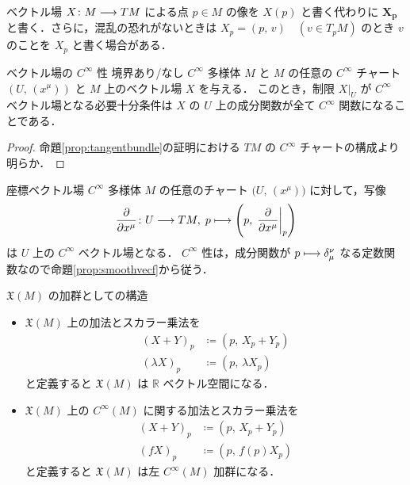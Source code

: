 \documentclass[TQFT_main]{subfiles}
\begin{document}
\begin{marker}
    ベクトル場 $X \colon M \longrightarrow TM$ による点 $ p\in M$ の像を $X(p)$ と書く代わりに $\bm{X_p}$ と書く．さらに，混乱の恐れがないときは $X_p = (p,\, v)\quad (v \in T_p M)$ のとき $v$ のことを $X_p$ と書く場合がある．
\end{marker}


\begin{myprop}[label=prop:smoothvecf]{ベクトル場の $C^\infty$ 性}
    境界あり/なし $C^\infty$ 多様体 $M$ と $M$ の任意の $C^\infty$ チャート $(U,\, (x^\mu))$ と $M$ 上のベクトル場 $X$ を与える．
    このとき，制限 $X|_U$ が $C^\infty$ ベクトル場となる必要十分条件は $X$ の $U$ 上の成分関数が全て $C^\infty$ 関数になることである．
\end{myprop}

\begin{proof}
    命題\ref{prop:tangentbundle}の証明における $TM$ の $C^\infty$ チャートの構成より明らか．
\end{proof}

\begin{myexample}[label=def:coord-vecf]{座標ベクトル場}
    $C^\infty$ 多様体 $M$ の任意のチャート $\bigl( U,\, (x^\mu) \bigr)$ に対して，写像
    \begin{align}
        \pdv{}{x^\mu} \colon U \lto TM,\; p \lmto \left(p,\, \eval{\pdv{}{x^\mu}}_p\right)
    \end{align}
    は $U$ 上の $C^\infty$ ベクトル場となる．
    $C^\infty$ 性は，成分関数が $p \longmapsto \delta^\nu_\mu$ なる定数関数なので命題\ref{prop:smoothvecf}から従う．
\end{myexample}

\begin{myprop}[label=prop:vecf-module]{$\mathfrak{X}(M)$ の加群としての構造}
    \begin{itemize}
        \item $\mathfrak{X}(M)$ 上の加法とスカラー乗法を
        \begin{align}
            (X + Y)_p &\coloneqq (p,\, X_p + Y_p) \\
            (\lambda X)_p &\coloneqq (p,\, \lambda X_p)
        \end{align}
        と定義すると $\mathfrak{X}(M)$ は $\mathbb{R}$ ベクトル空間になる．
        \item $\mathfrak{X}(M)$ 上の $C^\infty (M)$ に関する加法とスカラー乗法を
        \begin{align}
            (X + Y)_p &\coloneqq (p,\, X_p + Y_p) \\
            (f X)_p &\coloneqq (p,\, f(p) X_p)
        \end{align}
        と定義すると $\mathfrak{X}(M)$ は左 $C^\infty (M)$ 加群になる．
    \end{itemize}
\end{myprop}
\end{document}
